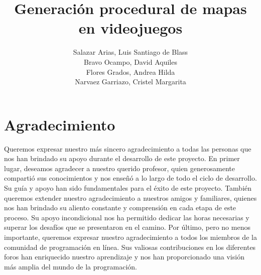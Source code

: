 \documentclass[stu, 12pt, letterpaper, donotrepeattitle, floatsintext, natbib]{apa7}
\title{\Large Generación procedural de mapas en videojuegos}
\author{ Salazar Arias, Luis Santiago de Blass \\Bravo Ocampo, David Aquiles \\Flores Grados, Andrea Hilda \\ Narvaez Garriazo, Cristel Margarita
}
\affiliation{\Huge\textbf{Universidad San Ignacio de Loyola}}
\begin{document}
\maketitle




\renewcommand\contentsname{\largeÍndice}
\tableofcontents
\setcounter{tocdepth}{2}
\newpage
\renewcommand{\listfigurename}{\largeÍndice de fíguras}
\listoffigures
\newpage
\renewcommand{\listtablename}{\largeÍndice de tablas}
\listoftables
\newpage

\section{\large Agradecimiento}
Queremos expresar nuestro más sincero agradecimiento a todas las personas que nos han brindado su apoyo durante el desarrollo de este proyecto. En primer lugar, deseamos agradecer a nuestro querido profesor, quien generosamente compartió sus conocimientos y nos enseñó a lo largo de todo el ciclo de desarrollo. Su guía y apoyo han sido fundamentales para el éxito de este proyecto.
También queremos extender nuestro agradecimiento a nuestros amigos y familiares, quienes nos han brindado su aliento constante y comprensión en cada etapa de este proceso. Su apoyo incondicional nos ha permitido dedicar las horas necesarias y superar los desafíos que se presentaron en el camino.
Por último, pero no menos importante, queremos expresar nuestro agradecimiento a todos los miembros de la comunidad de programación en línea. Sus valiosas contribuciones en los diferentes foros han enriquecido nuestro aprendizaje y nos han proporcionado una visión más amplia del mundo de la programación.
\newpage
\end{document}
